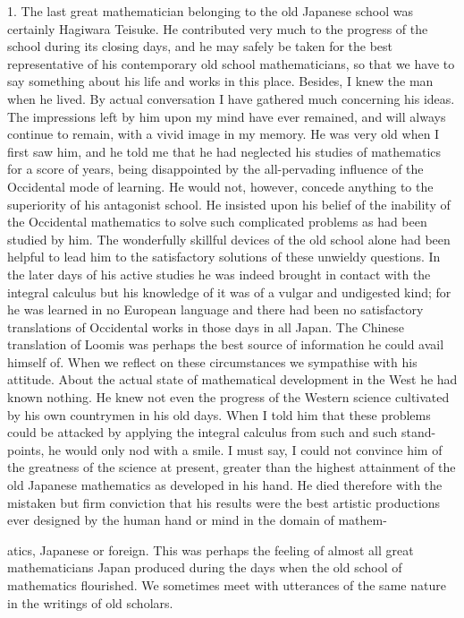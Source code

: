 \documentclass[11pt]{article}
\newcommand{\scanpage}[2]{\clearpage\setcounter{footnote}{0}\noindent{\footnotesize\color{gray}PDF page #1 · #2}\par\medskip}
\begin{document}
1. The last great mathematician belonging to the old Japanese school was certainly Hagiwara Teisuke. He contributed very much to the progress of the school during its closing days, and he may safely be taken for the best representative of his contemporary old school mathematicians, so that we have to say something about his life and works in this place. Besides, I knew the man when he lived. By actual conversation I have gathered much concerning his ideas. The impressions left by him upon my mind have ever remained, and will always continue to remain, with a vivid image in my memory. He was very old when I first saw him, and he told me that he had neglected his studies of mathematics for a score of years, being disappointed by the all-pervading influence of the Occidental mode of learning. He would not, however, concede anything to the superiority of his antagonist school. He insisted upon his belief of the inability of the Occidental mathematics to solve such complicated problems as had been studied by him. The wonderfully skillful devices of the old school alone had been helpful to lead him to the satisfactory solutions of these unwieldy questions. In the later days of his active studies he was indeed brought in contact with the integral calculus but his knowledge of it was of a vulgar and undigested kind; for he was learned in no European language and there had been no satisfactory translations of Occidental works in those days in all Japan. The Chinese translation of Loomis was perhaps the best source of information he could avail himself of. When we reflect on these circumstances we sympathise with his attitude. About the actual state of mathematical development in the West he had known nothing. He knew not even the progress of the Western science cultivated by his own countrymen in his old days. When I told him that these problems could be attacked by applying the integral calculus from such and such stand-points, he would only nod with a smile. I must say, I could not convince him of the greatness of the science at present, greater than the highest attainment of the old Japanese mathematics as developed in his hand. He died therefore with the mistaken but firm conviction that his results were the best artistic productions ever designed by the human hand or mind in the domain of mathem-

\scanpage{0316}{printed page 302 (top left)}
\noindent atics, Japanese or foreign. This was perhaps the feeling of almost all great mathematicians Japan produced during the days when the old school of mathematics flourished. We sometimes meet with utterances of the same nature in the writings of old scholars.
\end{document}
